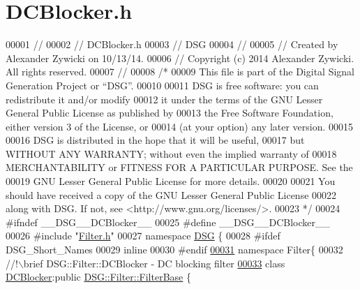 \hypertarget{_d_c_blocker_8h_source}{\section{D\+C\+Blocker.\+h}
\label{_d_c_blocker_8h_source}
}

\begin{DoxyCode}
00001 \textcolor{comment}{//}
00002 \textcolor{comment}{//  DCBlocker.h}
00003 \textcolor{comment}{//  DSG}
00004 \textcolor{comment}{//}
00005 \textcolor{comment}{//  Created by Alexander Zywicki on 10/13/14.}
00006 \textcolor{comment}{//  Copyright (c) 2014 Alexander Zywicki. All rights reserved.}
00007 \textcolor{comment}{//}
00008 \textcolor{comment}{/*}
00009 \textcolor{comment}{ This file is part of the Digital Signal Generation Project or “DSG”.}
00010 \textcolor{comment}{}
00011 \textcolor{comment}{ DSG is free software: you can redistribute it and/or modify}
00012 \textcolor{comment}{ it under the terms of the GNU Lesser General Public License as published by}
00013 \textcolor{comment}{ the Free Software Foundation, either version 3 of the License, or}
00014 \textcolor{comment}{ (at your option) any later version.}
00015 \textcolor{comment}{}
00016 \textcolor{comment}{ DSG is distributed in the hope that it will be useful,}
00017 \textcolor{comment}{ but WITHOUT ANY WARRANTY; without even the implied warranty of}
00018 \textcolor{comment}{ MERCHANTABILITY or FITNESS FOR A PARTICULAR PURPOSE.  See the}
00019 \textcolor{comment}{ GNU Lesser General Public License for more details.}
00020 \textcolor{comment}{}
00021 \textcolor{comment}{ You should have received a copy of the GNU Lesser General Public License}
00022 \textcolor{comment}{ along with DSG.  If not, see <http://www.gnu.org/licenses/>.}
00023 \textcolor{comment}{ */}
00024 \textcolor{preprocessor}{#ifndef \_\_DSG\_\_DCBlocker\_\_}
00025 \textcolor{preprocessor}{#define \_\_DSG\_\_DCBlocker\_\_}
00026 \textcolor{preprocessor}{#include "\hyperlink{_filter_8h}{Filter.h}"}
00027 \textcolor{keyword}{namespace }\hyperlink{namespace_d_s_g}{DSG} \{
00028 \textcolor{preprocessor}{#ifdef DSG\_Short\_Names}
00029     \textcolor{keyword}{inline}
00030 \textcolor{preprocessor}{#endif}
\hypertarget{_d_c_blocker_8h_source_l00031}{}\hyperlink{namespace_d_s_g_1_1_filter}{00031}     \textcolor{keyword}{namespace }Filter\{\textcolor{comment}{}
00032 \textcolor{comment}{        //!\(\backslash\)brief DSG::Filter::DCBlocker - DC blocking filter}
\hypertarget{_d_c_blocker_8h_source_l00033}{}\hyperlink{class_d_s_g_1_1_filter_1_1_d_c_blocker}{00033} \textcolor{comment}{}        \textcolor{keyword}{class }\hyperlink{class_d_s_g_1_1_filter_1_1_d_c_blocker}{DCBlocker}:\textcolor{keyword}{public} \hyperlink{class_d_s_g_1_1_filter_1_1_filter_base}{DSG::Filter::FilterBase} \{

\end{DoxyCode}
